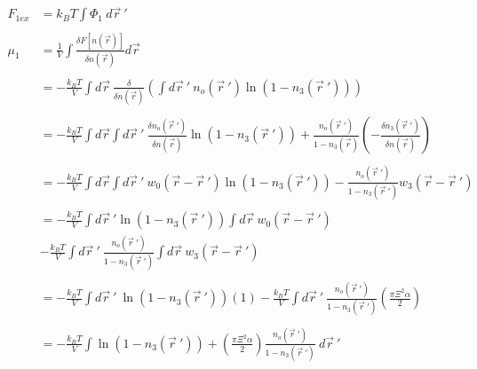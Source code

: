 \documentclass[double,12pt]{beavtex}
\begin{document}
\begin{align}
    F_{1ex} &= k_BT\int \Phi_1~d\vec r~' \\ \nonumber\\
    \mu_1 &= \frac{1}{V}\int \frac{\delta F[n(\vec r)]}{\delta n(\vec r)} d\vec r \\ \nonumber\\
%
        &= -\frac{k_BT}{V} \int d\vec r ~\frac{\delta}
        {\delta n(\vec r)}\left(\int d\vec r~'~n_o(\vec r~')\ln(1-n_3(\vec r~'))\right) \\ \nonumber\\
%
        &= -\frac{k_BT}{V}\int d\vec r\int d\vec r~'~\frac{\delta n_o(\vec r~')}
        {\delta n(\vec r)}\ln(1-n_3(\vec r~'))+\frac{n_o(\vec r~')}
          {1-n_3(\vec r)}\left(-\frac{\delta n_3(\vec r~')}{\delta n(\vec r)}
          \right) \\ \nonumber\\
%
        &= -\frac{k_BT}{V} \int d\vec r \int d\vec r~' ~w_0(\vec r - \vec r~')
          \ln(1-n_3(\vec r~')) - \frac{n_o(\vec r~')}
          {1-n_3(\vec r~')}w_3(\vec r - \vec r~') \\ \nonumber\\
%
        &= -\frac{k_BT}{V} \int d\vec r~'\ln(1-n_3(\vec r~')) \int d \vec r  
          ~w_0(\vec r - \vec r~') \nonumber\\
        &- \frac{k_BT}{V} \int d\vec r~' ~\frac{n_o(\vec r~')}{1-n_3(\vec r~')} 
          \int d \vec r~w_3(\vec r - \vec r~')  \\ \\
%
        &= -\frac{k_BT}{V} \int d\vec r~' ~\ln(1-n_3(\vec r~'))(1)
          - \frac{k_BT}{V} \int d\vec r~' ~\frac{n_o(\vec r~')}{1-n_3(\vec r~')}
          \left(\frac{\pi\Xi^2\alpha}{2}\right) \\ \\
%
        &= -\frac{k_BT}{V}\int\ln(1-n_3(\vec r~'))+\left(
        \frac{\pi\Xi^2\alpha}{2}\right)\frac{n_o(\vec r~')}{1-n_3(\vec r~')}~d\vec r~'
\end{align}
\end{document}
